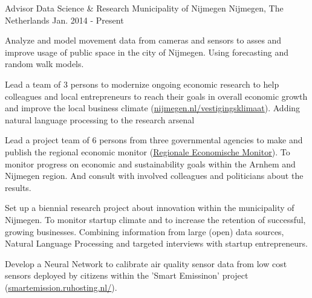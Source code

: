 

\begin{cventries}

  \cventry
    {Advisor Data Science \& Research} %
    {Municipality of Nijmegen} %
    {Nijmegen, The Netherlands} %
    {Jan. 2014 - Present} %
    {
      \begin{cvitems} %
      \item {Analyze and model movement data from cameras and sensors to asses and improve usage of public space in the city of Nijmegen. Using forecasting and random walk models.}
      \item {Lead a team of 3 persons to modernize ongoing economic research to help colleagues and local entrepreneurs to reach their goals in overall economic growth and improve the local business climate (\underline{\href{http://nijmegen.nl/vestigingsklimaat}{nijmegen.nl/vestigingsklimaat}}). Adding natural language processing to the research arsenal}
      \item {Lead a project team of 6 persons from three governmental agencies to make and publish the regional economic monitor (\underline{\href{https://public.tableau.com/views/REM_1/Index?:embed=y&:display_count=yes&:showVizHome=no}{Regionale Economische Monitor}}). To monitor progress on economic and sustainability goals within the Arnhem and Nijmegen region. And consult with involved colleagues and politicians about the results.}
      \item {Set up a biennial research project about innovation within the municipality of Nijmegen. To monitor startup climate and to increase the retention of successful, growing businesses. Combining information from large (open) data sources, Natural Language Processing and targeted interviews with startup entrepreneurs.}
      \item {Develop a Neural Network to calibrate air quality sensor data from low cost sensors deployed by citizens within the 'Smart Emissinon' project (\underline{\href{http://smartemission.ruhosting.nl/}{smartemission.ruhosting.nl/}}).}
    \end{cvitems}
    }


\end{cventries}

